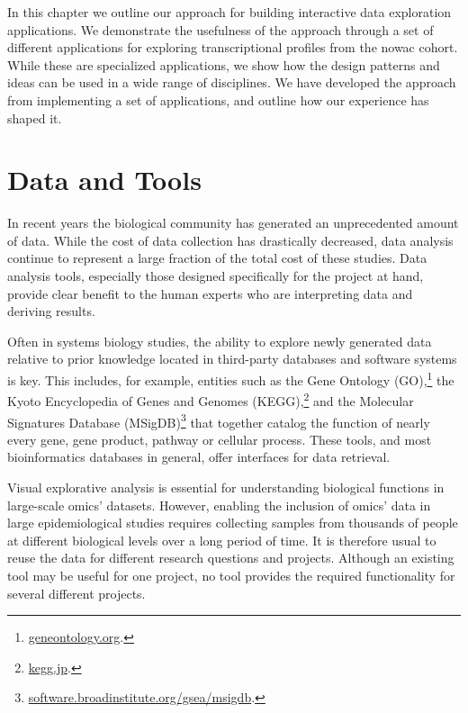 In this chapter we outline our approach for building interactive data
exploration applications. We demonstrate the usefulness of the approach through
a set of different applications for exploring transcriptional profiles from the
\gls{nowac} cohort. While these are specialized applications, we show how the
design patterns and ideas can be used in a wide range of disciplines. We have
developed the approach from implementing a set of applications, and outline how
our experience has shaped it. 

\section{Data and Tools} 
In recent years the biological community has  generated  an unprecedented amount
of data.  While the cost of data collection has drastically decreased, data
analysis continue to represent a large fraction of the total  cost of these
studies.\cite{sboner2011real} Data analysis tools, especially those designed
specifically for the project at hand, provide clear benefit to the human experts
who are interpreting data and deriving results.

Often in systems biology studies, the ability to explore newly generated data
relative to prior knowledge located in third-party databases and software
systems is key.  This includes, for example, entities such as the Gene
Ontology (GO),\footnote{\url{geneontology.org}.} the Kyoto Encyclopedia of Genes
and Genomes (KEGG),\footnote{\url{kegg.jp}.} and the Molecular Signatures
Database (MSigDB)\footnote{\url{software.broadinstitute.org/gsea/msigdb}.} that
together
catalog the function of nearly every gene, gene product, pathway or cellular
process. These tools, and most bioinformatics databases in general, offer
interfaces for data retrieval.

Visual explorative analysis is essential for understanding biological
functions in large-scale omics' datasets. However, enabling the inclusion of
omics' data in large epidemiological studies requires collecting samples
from thousands of people at different biological levels over a long period
of time.  It is therefore usual to reuse the data for different research
questions and projects.  Although an existing tool may be useful for one
project, no tool provides the required functionality for several different
projects. 

